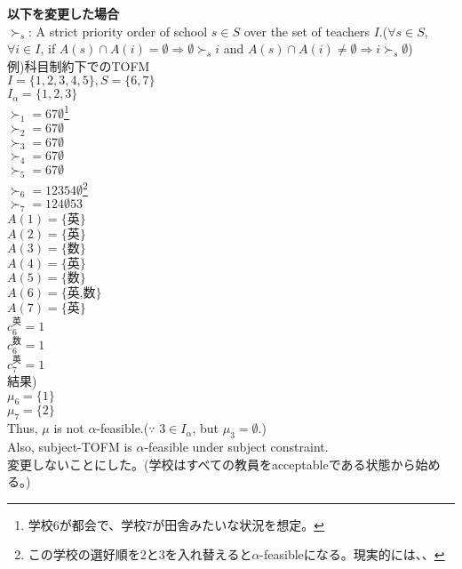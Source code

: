 \documentclass[a4j,10pt]{jsarticle}
\theoremstyle{definition}
\theoremstyle{remark}
\theoremstyle{plain}
\begin{document}
\begin{tcolorbox}
  \textbf{以下を変更した場合}\\
$\succ_s$: A strict priority order of school $s \in S$ over the set of teachers $I$.($\forall s \in S$, $\forall i \in I$, if $A(s)\cap A(i) = \emptyset \Rightarrow \emptyset \succ_s i$ and $A(s)\cap A(i) \neq \emptyset \Rightarrow i \succ_s \emptyset$)\\


例)科目制約下でのTOFM\\
$I = \{1,2,3,4,5\}, S = \{6,7\}$\\
$I_\alpha = \{1,2,3\}$\\
$\succ_1 = 67\emptyset$\footnote{学校6が都会で、学校7が田舎みたいな状況を想定。}\\
$\succ_2 = 67\emptyset$\\
$\succ_3 = 67\emptyset$\\
$\succ_4 = 67\emptyset$\\
$\succ_5 = 67\emptyset$\\
$\succ_6 = 12354\emptyset$\footnote{この学校の選好順を2と3を入れ替えると$\alpha$-feasibleになる。現実的には、、}\\
$\succ_7 = 124\emptyset 53$\\

$A(1) = \{\text{英}\}$\\
$A(2) = \{\text{英}\}$\\
$A(3) = \{\text{数}\}$\\
$A(4) = \{\text{英}\}$\\
$A(5) = \{\text{数}\}$\\
$A(6) = \{\text{英,数}\}$\\
$A(7) = \{\text{英}\}$\\
$c_6^{\text{英}} = 1$\\
$c_6^{\text{数}} = 1$\\
$c_7^{\text{英}} = 1$\\

結果)\\
$\mu_6 = \{1\}$\\
$\mu_7 = \{2\}$\\

Thus, $\mu$ is not $\alpha$-feasible.($\because$ $3 \in I_\alpha$, but $\mu_3 = \emptyset$.)\\

Also, subject-TOFM is $\alpha$-feasible under subject constraint.\\

変更しないことにした。(学校はすべての教員をacceptableである状態から始める。)\\
\end{tcolorbox}
\end{document}

